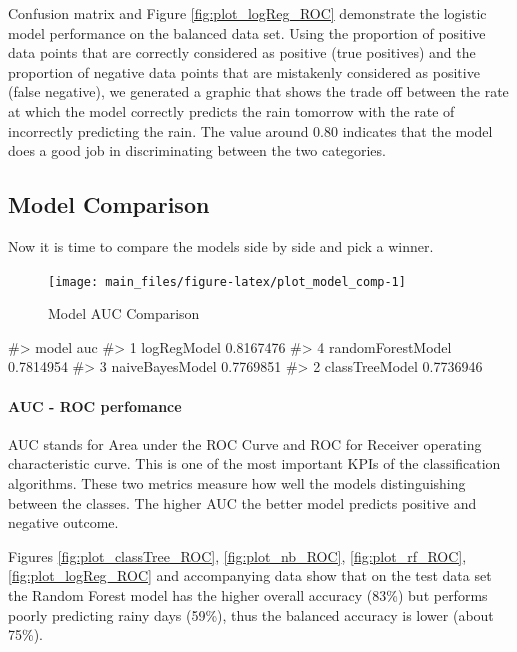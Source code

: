 Confusion matrix and Figure \ref{fig:plot_logReg_ROC} demonstrate the
logistic model performance on the balanced data set. Using the
proportion of positive data points that are correctly considered as
positive (true positives) and the proportion of negative data points
that are mistakenly considered as positive (false negative), we
generated a graphic that shows the trade off between the rate at which
the model correctly predicts the rain tomorrow with the rate of
incorrectly predicting the rain. The value around 0.80 indicates that
the model does a good job in discriminating between the two categories.

\hypertarget{model-comparison}{%
\subsection{Model Comparison}\label{model-comparison}}

Now it is time to compare the models side by side and pick a winner.

\begin{Schunk}
\begin{figure}[H]

{\centering \texttt{[image: main\_files/figure-latex/plot\_model\_comp-1]} 

}

\caption[Model AUC Comparison]{Model AUC Comparison}\label{fig:plot_model_comp}
\end{figure}
\begin{Soutput}
#>               model       auc
#> 1       logRegModel 0.8167476
#> 4 randomForestModel 0.7814954
#> 3   naiveBayesModel 0.7769851
#> 2    classTreeModel 0.7736946
\end{Soutput}
\end{Schunk}

\hypertarget{auc---roc-perfomance}{%
\paragraph{AUC - ROC perfomance}\label{auc---roc-perfomance}}

AUC stands for Area under the ROC Curve and ROC for Receiver operating
characteristic curve. This is one of the most important KPIs of the
classification algorithms. These two metrics measure how well the models
distinguishing between the classes. The higher AUC the better model
predicts positive and negative outcome.

Figures \ref{fig:plot_classTree_ROC}, \ref{fig:plot_nb_ROC},
\ref{fig:plot_rf_ROC}, \ref{fig:plot_logReg_ROC} and accompanying data
show that on the test data set the Random Forest model has the higher
overall accuracy (83\%) but performs poorly predicting rainy days
(59\%), thus the balanced accuracy is lower (about 75\%).

